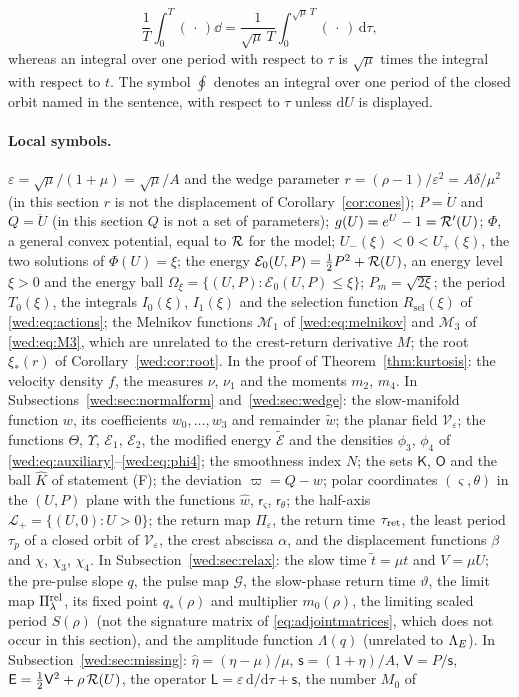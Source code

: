 \[
\frac1T\int_0^T(\,\cdot\,)\dd=\frac1{\sqrt\mu\,T}\int_0^{\sqrt\mu\,T}(\,\cdot\,)\,\mathrm d\tau ,
\]
whereas an integral over one period with respect to $\tau$ is $\sqrt\mu$ times the integral with respect to $t$. The symbol $\oint$ denotes an integral over one period of the closed orbit named in the sentence, with respect to $\tau$ unless $\mathrm dU$ is displayed.

\paragraph{Local symbols.}
$\varepsilon=\sqrt\mu/(1+\mu)=\sqrt\mu/A$ and the wedge parameter $r=(\rho-1)/\varepsilon^2=A\delta/\mu^2$ (in this section $r$ is not the displacement of Corollary~\ref{cor:cones}); $P=\dot U$ and $Q=\ddot U$ (in this section $Q$ is not a set of parameters); $g(U)=e^U-1=\mathcal R'(U)$; $\Phi$, a general convex potential, equal to $\mathcal R$ for the model; $U_-(\xi)<0<U_+(\xi)$, the two solutions of $\Phi(U)=\xi$; the energy $\mathcal E_0(U,P)=\tfrac12P^2+\mathcal R(U)$, an energy level $\xi>0$ and the energy ball $\Omega_\xi=\{(U,P):\mathcal E_0(U,P)\le\xi\}$; $P_m=\sqrt{2\xi}$; the period $T_0(\xi)$, the integrals $I_0(\xi)$, $I_1(\xi)$ and the selection function $R_{\mathrm{sel}}(\xi)$ of \eqref{wed:eq:actions}; the Melnikov functions $\mathcal M_1$ of \eqref{wed:eq:melnikov} and $\mathcal M_3$ of \eqref{wed:eq:M3}, which are unrelated to the crest-return derivative $M$; the root $\xi_*(r)$ of Corollary~\ref{wed:cor:root}. In the proof of Theorem~\ref{thm:kurtosis}: the velocity density $f$, the measures $\nu$, $\nu_1$ and the moments $m_2$, $m_4$. In Subsections~\ref{wed:sec:normalform} and~\ref{wed:sec:wedge}: the slow-manifold function $w$, its coefficients $w_0,\dots,w_3$ and remainder $\tilde w$; the planar field $\mathcal V_\varepsilon$; the functions $\Theta$, $\Upsilon$, $\mathcal E_1$, $\mathcal E_2$, the modified energy $\tilde{\mathcal E}$ and the densities $\phi_3$, $\phi_4$ of \eqref{wed:eq:auxiliary}--\eqref{wed:eq:phi4}; the smoothness index $N$; the sets $\mathsf K$, $\mathsf O$ and the ball $\hat K$ of statement \textup{(F)}; the deviation $\varpi=Q-w$; polar coordinates $(\varsigma,\theta)$ in the $(U,P)$ plane with the functions $\hat w$, $\mathsf r_\varsigma$, $\mathsf r_\theta$; the half-axis $\mathcal L_+=\{(U,0):U>0\}$; the return map $\Pi_\varepsilon$, the return time $\tau_{\rm ret}$, the least period $\tau_p$ of a closed orbit of $\mathcal V_\varepsilon$, the crest abscissa $\alpha$, and the displacement functions $\beta$ and $\chi$, $\chi_3$, $\chi_4$. In Subsection~\ref{wed:sec:relax}: the slow time $\tilde t=\mu t$ and $V=\mu U$; the pre-pulse slope $q$, the pulse map $\mathcal G$, the slow-phase return time $\vartheta$, the limit map $\Pi^{\rm rel}_\lambda$, its fixed point $q_*(\rho)$ and multiplier $m_0(\rho)$, the limiting scaled period $S(\rho)$ (not the signature matrix of \eqref{eq:adjointmatrices}, which does not occur in this section), and the amplitude function $\Lambda(q)$ (unrelated to $\Lambda_E$). In Subsection~\ref{wed:sec:missing}: $\hat\eta=(\eta-\mu)/\mu$, $\mathsf s=(1+\eta)/A$, $\mathsf V=P/\mathsf s$, $\mathsf E=\tfrac12\mathsf V^2+\rho\,\mathcal R(U)$, the operator $\mathsf L=\varepsilon\,\mathrm d/\mathrm d\tau+\mathsf s$, the number $M_0$ of 